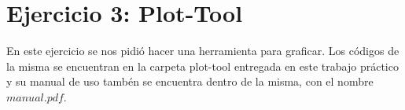 \section{Ejercicio 3: Plot-Tool}
\quad \quad En este ejercicio se nos pidi\'o hacer una herramienta para graficar. Los c\'odigos de la misma se encuentran en la carpeta plot-tool entregada en este trabajo pr\'actico y su manual de uso tamb\'en se encuentra dentro de la misma, con el nombre $manual.pdf$. 